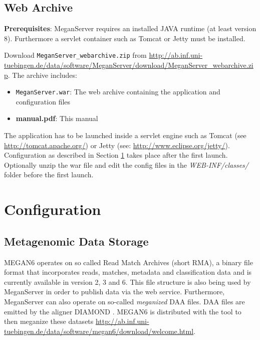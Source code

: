 \documentclass[11pt]{article}
\begin{document}


\subsection{Web Archive}
\textbf{Prerequisites}: MeganServer requires an installed JAVA runtime (at least version 8). Furthermore a servlet container such as Tomcat or Jetty must be installed.

Download \texttt{MeganServer\_webarchive.zip} from \url{http://ab.inf.uni-tuebingen.de/data/software/MeganServer/download/MeganServer\_webarchive.zip}. The archive includes:

\begin{itemize}
\item \texttt{MeganServer.war}: The web archive containing the application and configuration files
\item \textbf{manual.pdf}: This manual
\end{itemize}


The application has to be launched inside a servlet engine such as Tomcat (see \url{http://tomcat.apache.org/}) or Jetty (see: \url{http://www.eclipse.org/jetty/}). Configuration as described in Section \ref{sec:config} takes place after the first launch. Optionally unzip the war file and edit the config files in the \textit{WEB-INF/classes/} folder before the first launch.

\section{Configuration}
\label{sec:config}

\subsection{Metagenomic Data Storage}
\label{subsec:props}

MEGAN6 operates on so called Read Match Archives (short RMA), a binary file format that incorporates reads, matches, metadata and classification data and is currently available in version 2, 3 and 6. This file structure is also being used by MeganServer in order to publish data via the web service. Furthermore, MeganServer can also operate on so-called \textit{meganized} DAA files. DAA files are emitted by the aligner DIAMOND \cite{DIAMOND}. MEGAN6 is distributed with the tool to then meganize these datasets \url{http://ab.inf.uni-tuebingen.de/data/software/megan6/download/welcome.html}. 
\end{document}
